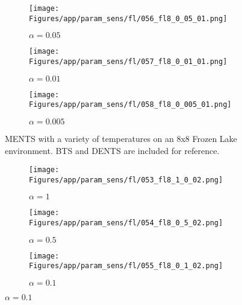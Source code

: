 \documentclass{article}
\theoremstyle{plain}
\begin{document}
\begin{appendices}
\begin{figure}
                \begin{subfigure}[b]{0.32\textwidth}
                    \centering
                    \texttt{[image: Figures/app/param\_sens/fl/056\_fl8\_0\_05\_01.png]}
                    \caption{$\alpha=0.05$}
                \end{subfigure}
                \begin{subfigure}[b]{0.32\textwidth}
                    \centering
                    \texttt{[image: Figures/app/param\_sens/fl/057\_fl8\_0\_01\_01.png]}
                    \caption{$\alpha=0.01$}
                \end{subfigure}
                \begin{subfigure}[b]{0.32\textwidth}
                    \centering
                    \texttt{[image: Figures/app/param\_sens/fl/058\_fl8\_0\_005\_01.png]}
                    \caption{$\alpha=0.005$}
                \end{subfigure}
                
                \caption{MENTS with a variety of temperatures on an 8x8 Frozen Lake environment. BTS and DENTS are included for reference.}
                \label{fig:fl_param_sens_ments}
            \end{figure}
            
            \begin{figure}
                \centering
                
                \begin{subfigure}[b]{0.32\textwidth}
                    \centering
                    \texttt{[image: Figures/app/param\_sens/fl/053\_fl8\_1\_0\_02.png]}
                    \caption{$\alpha=1$}
                \end{subfigure}
                \begin{subfigure}[b]{0.32\textwidth}
                    \centering
                    \texttt{[image: Figures/app/param\_sens/fl/054\_fl8\_0\_5\_02.png]}
                    \caption{$\alpha=0.5$}
                \end{subfigure}
                \begin{subfigure}[b]{0.32\textwidth}
                    \centering
                    \texttt{[image: Figures/app/param\_sens/fl/055\_fl8\_0\_1\_02.png]}
                    \caption{$\alpha=0.1$}
                \end{subfigure}
                

\end{figure}
\end{appendices}
\end{document}
